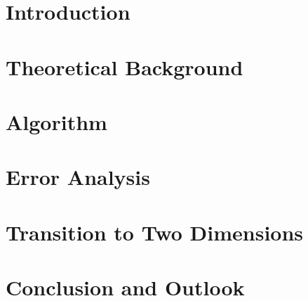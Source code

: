 \documentclass[12pt,twoside]{report}  %
\begin{document}

\newpage


\newpage

\tableofcontents
\listoffigures        %
\listoftables         %

\clearpage
{}

\chapter{Introduction}

\newpage

\chapter{Theoretical Background}
\label{chap:theory}



\chapter{Algorithm}
\label{chap:algorithm}


\chapter{Error Analysis}
\label{chap:error}


\chapter{Transition to Two Dimensions}
\label{chap:2d}


\chapter{Conclusion and Outlook}


\clearpage

\end{document}
